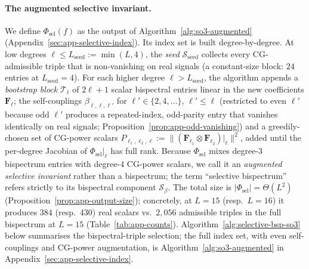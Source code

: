 \documentclass{article}
\theoremstyle{definition}
\theoremstyle{remark}
\theoremstyle{definition}
\begin{document}
\paragraph{The augmented selective invariant.} We define
$\Phi_{\mathrm{sel}}(f)$ as the output of
Algorithm~\ref{alg:so3-augmented}
(Appendix~\ref{sec:app-selective-index}). Its index set is built
degree-by-degree. At low degrees $\ell\le L_{\mathrm{seed}}:=\min(L,4)$,
the \emph{seed} $\mathcal{S}_{\mathrm{seed}}$ collects every
CG-admissible triple that is non-vanishing on real signals (a
constant-size block: $24$ entries at $L_{\mathrm{seed}}=4$). For each
higher degree $\ell > L_{\mathrm{seed}}$, the algorithm appends a
\emph{bootstrap block} $\mathcal{T}_\ell$ of $2\ell{+}1$ scalar
bispectral entries linear in the new coefficients $\mathbf{F}_\ell$;
the self-couplings $\beta_{\ell,\ell,\ell'}$ for
$\ell'\in\{2,4,\dots\}$, $\ell'\le\ell$ (restricted to even $\ell'$
because odd $\ell'$ produces a repeated-index, odd-parity entry that
vanishes identically on real signals;  Proposition~\ref{prop:app-odd-vanishing}) and a greedily-chosen set
of CG-power scalars
$P_{\ell_1,\ell_2,\ell} := \lVert(\mathbf{F}_{\ell_1}\otimes
\mathbf{F}_{\ell_2})|_\ell\rVert^2$, added until the per-degree
Jacobian of $\Phi_{\mathrm{sel}}|_\ell$ has full rank.
Because $\Phi_{\mathrm{sel}}$ mixes degree-$3$ bispectrum entries
with degree-$4$ CG-power scalars, we call it an \emph{augmented
selective invariant} rather than a bispectrum; the term
``selective bispectrum'' refers strictly to its bispectral component
$\mathcal{S}_\beta$. The total size is
$|\Phi_{\mathrm{sel}}| = \Theta(L^2)$
(Proposition~\ref{prop:app-output-size}); concretely, at $L=15$
(resp.\ $L=16$) it produces $384$ (resp.\ $430$) real scalars vs.\
$2{,}056$ admissible triples in the full bispectrum at $L=15$
(Table~\ref{tab:app-counts}). Algorithm~\ref{alg:selective-bsp-so3}
below summarises the bispectral-triple selection; the full index
set, with even self-couplings and CG-power augmentation, is
Algorithm~\ref{alg:so3-augmented} in
Appendix~\ref{sec:app-selective-index}.
\end{document}
